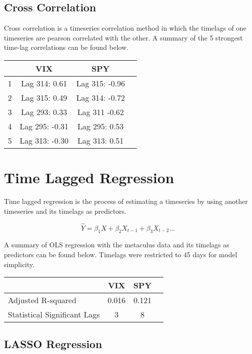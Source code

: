 \documentclass{article}
\begin{document}
\subsection*{Cross Correlation}
Cross correlation is a timeseries correlation method in which the timelags of one timeseries are pearson correlated with the other. A summary of the 5 strongest time-lag correlations can be found below.

\begin{table}[h]
    \centering
\begin{tabular}{l||ccc}
    \toprule
     & \textbf{VIX} & \textbf{SPY} & \\
    \midrule
    1 & Lag 314: 0.61 & Lag 315: -0.96 \\
    2 & Lag 315: 0.49 & Lag 314: -0.72\\
    3 & Lag 293: 0.33 & Lag 311 -0.62\\
    4 & Lag 295: -0.31 & Lag 295: 0.53\\
    5 & Lag 313: -0.30 & Lag 313: 0.51\\
    \bottomrule
\end{tabular}
\end{table}


\section*{Time Lagged Regression}

Time lagged regression is the process of estimating a timeseries by using another timeseries and its timelags as predictors. 

$$
\hat{Y} = \beta_1 X + \beta_2 X_{t-1} + \beta_3 X_{t-2} ...
$$

A summary of OLS regression with the metaculus data and its timelags as predictors can be found below. Timelags were restricted to 45 days for model simplicity. 

\begin{table}[h]
    \centering
\begin{tabular}{l||ccc}
    \toprule
     & \textbf{VIX} & \textbf{SPY} & \\
    \midrule
    Adjusted R-squared & 0.016 & 0.121 \\
    Statistical Significant Lags & 3 & 8\\
    \bottomrule
\end{tabular}
\end{table}


\subsection*{LASSO Regression}
\end{document}
